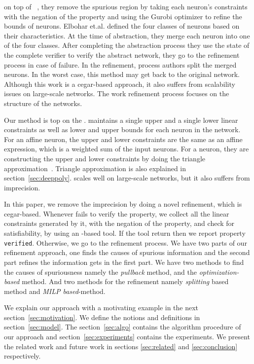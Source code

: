 on top of \deeppoly{}~\cite{singh2019abstract}, they remove
the spurious region by taking each neuron's constraints with the negation of the property and using the 
Gurobi optimizer \cite{gurobioptimizer} to refine the bounds of neurons.
Elbohar et.al. \cite{elboher2020abstraction} defined the four classes of neurons based on their characteristics.
At the time of abstraction, they merge each neuron into one of the four classes. 
After completing the abstraction process they use the state of the complete verifier to verify 
the abstract network, they go to the refinement process in case of failure.  
In the refinement, process authors split the merged neurons. 
In the worst case, this method may get back to the original network. 
Although this work is a cegar-based approach, it also suffers from scalability issues on large-scale networks.  
The work \cite{elboher2020abstraction} refinement process focuses on the structure of the networks.

Our method is top on the \deeppoly{}. 
\deeppoly{} maintains a single upper and a single lower linear constraints as well as lower and upper bounds
for each neuron in the network. For an affine neuron, the upper and lower constraints are the same as an affine expression, 
which is a weighted sum of the input neurons. For a \relu{} neuron, they are constructing the upper and lower constraints
by doing the triangle approximation~\cite{singh2019abstract}. 
Triangle approximation is also explained in section~\ref{sec:deeppoly}. 
\deeppoly{} scales well on large-scale networks, but it also suffers from imprecision. 

In this paper, we remove the imprecision by doing a novel refinement, which is cegar-based. 
Whenever \deeppoly{} fails to verify the property, we collect all the linear constraints generated by it, 
with the negation of the property, and check for satisfiability, by using an \milp{}-based tool. 
If the tool return \unsat{} then we report property \texttt{verified}. Otherwise, we go to the refinement process.
We have two parts of our refinement approach, one finds the causes of spurious information 
and the second part refines the information gets in the first part. 
We have two methods to find the causes of spuriousness namely the {\em pullback} method, and the 
{\em optimization-based} method. And two methods for the refinement namely {\em splitting} based method and 
{\em MILP based}-method.    

We explain our approach with a motivating example in the next section~\ref{sec:motivation}. 
We define the notions and definitions in section~\ref{sec:model}. The section~\ref{sec:algo} contains the 
algorithm procedure of our approach and section~\ref{sec:experiments} contains the experiments. 
We present the related work and future work in sections \ref{sec:related} and \ref{sec:conclusion} respectively. 


